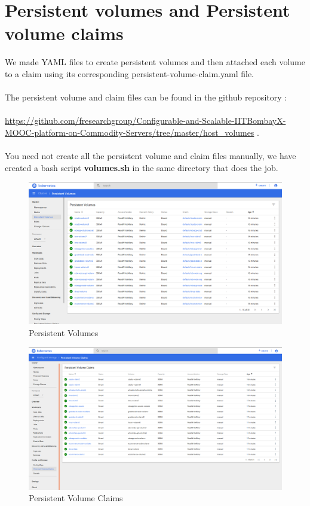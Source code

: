 \documentclass[12pt]{report}
\begin{document}
\section{Persistent volumes and Persistent volume claims}
We made YAML files to create persistent volumes and then attached each volume to a claim using its corresponding persistent-volume-claim.yaml file.\\\\
The persistent volume and claim files can be found in the github repository :\\\\ \href{https://github.com/fresearchgroup/Configurable-and-Scalable-IITBombayX-MOOC-platform-on-Commodity-Servers/tree/master/host_volumes}{https://github.com/fresearchgroup/Configurable-and-Scalable-IITBombayX-MOOC-platform-on-Commodity-Servers/tree/master/host\_volumes} \cite{Hostvolumes}. \\\\You need not create all the persistent volume and claim files manually, we have created a bash script \textbf{volumes.sh} in the same directory that does the job. 
\begin{figure}[h!]
	\begin{center}
		\includegraphics[totalheight=0.39\textheight]{PersistentVolume}
		\caption{Persistent Volumes}
	\end{center}
\end{figure}
\begin{figure}[h!]
	\begin{center}
		\includegraphics[totalheight=0.39\textheight]{PersistentVolumeClaim}
		\caption{Persistent Volume Claims}
	\end{center}
\end{figure}
\end{document}
